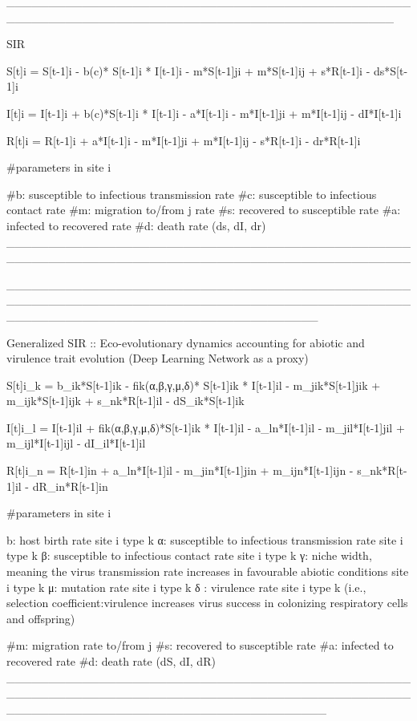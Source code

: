 
______________________________________________________________________________________________

SIR

  S[t]i = S[t-1]i - b(c)* S[t-1]i * I[t-1]i - m*S[t-1]ji + m*S[t-1]ij + s*R[t-1]i - ds*S[t-1]i
  
  I[t]i = I[t-1]i + b(c)*S[t-1]i * I[t-1]i - a*I[t-1]i - m*I[t-1]ji + m*I[t-1]ij - dI*I[t-1]i  
  
  R[t]i = R[t-1]i + a*I[t-1]i - m*I[t-1]ji + m*I[t-1]ij - s*R[t-1]i - dr*R[t-1]i
 
  
  #parameters in site i

  #b: susceptible to infectious transmission rate  
  #c: susceptible to infectious contact rate
  #m: migration to/from j rate
  #s: recovered to susceptible rate
  #a: infected to recovered rate
  #d: death rate (ds, dI, dr)
________________________________________________________________________________________________


_____________________________________________________________________________________________________________________________________

Generalized SIR :: Eco-evolutionary dynamics accounting for abiotic and virulence trait evolution (Deep Learning Network as a proxy)

  S[t]i_k = b_ik*S[t-1]ik - fik(α,β,γ,μ,δ)* S[t-1]ik * I[t-1]il - m_jik*S[t-1]jik + m_ijk*S[t-1]ijk + s_nk*R[t-1]il - dS_ik*S[t-1]ik
  
  I[t]i_l = I[t-1]il + fik(α,β,γ,μ,δ)*S[t-1]ik * I[t-1]il - a_ln*I[t-1]il - m_jil*I[t-1]jil + m_ijl*I[t-1]ijl - dI_il*I[t-1]il  
  
  R[t]i_n = R[t-1]in + a_ln*I[t-1]il - m_jin*I[t-1]jin + m_ijn*I[t-1]ijn - s_nk*R[t-1]il - dR_in*R[t-1]in
 
  
  #parameters in site i

  b: host birth rate site i type k
  α: susceptible to infectious transmission rate site i type k
  β: susceptible to infectious contact rate site i type k
  γ: niche width, meaning the virus transmission rate increases in favourable abiotic conditions site i type k
  μ: mutation rate site i type k
  δ : virulence rate site i type k (i.e., selection coefficient:virulence increases virus success in colonizing respiratory cells and offspring)

  #m: migration rate to/from j
  #s: recovered to susceptible rate
  #a: infected to recovered rate
  #d: death rate (dS, dI, dR)
______________________________________________________________________________________________________________________________________





